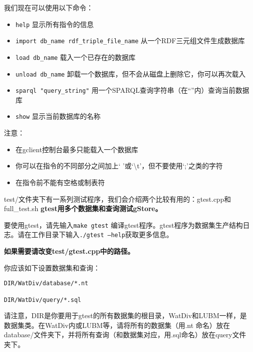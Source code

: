 \documentclass[titlepage, a4paper, 12pt]{article}
\begin{document}
我们现在可以使用以下命令：

\begin{itemize}
	\item
	\texttt{help} 显示所有指令的信息
	\item
	\texttt{import\ db\_name\ rdf\_triple\_file\_name} 从一个RDF三元组文件生成数据库
	\item
	\texttt{load\ db\_name} 载入一个已存在的数据库
	\item
	\texttt{unload\ db\_name} 卸载一个数据库，但不会从磁盘上删除它，你可以再次载入
	\item
	\texttt{sparql\ "query\_string"} 用一个SPARQL查询字符串（在``''内）查询当前数据库
	\item
	\texttt{show} 显示当前数据库的名称
\end{itemize}

注意：

\begin{itemize}
	\item
	在gclient控制台最多只能载入一个数据库
	\item
	你可以在指令的不同部分之间加上` '或`\textbackslash{}t'，但不要使用`;'之类的字符
	\item
	在指令前不能有空格或制表符
\end{itemize}


test/文件夹下有一系列测试程序，我们会介绍两个比较有用的：gtest.cpp和full\_test.sh
\textbf{gtest用多个数据集和查询测试gStore。}

要使用gtest，请先输入\texttt{make\ gtest} 编译gtest程序。gtest程序为数据集生产结构日志。请在工作目录下输入\texttt{./gtest\ --help}获取更多信息。

\textbf{如果需要请改变test/gtest.cpp中的路径。}

你应该如下设置数据集和查询：

\begin{verbatim}
DIR/WatDiv/database/*.nt

DIR/WatDiv/query/*.sql
\end{verbatim}

请注意，DIR是你要用于gtest的所有数据集的根目录，WatDiv和LUBM一样，是数据集类。在WatDiv内或LUBM等，请将所有的数据集（用.nt 命名）放在database/文件夹下，并将所有查询（和数据集对应，用.sql命名）放在query文件夹下。
\end{document}
